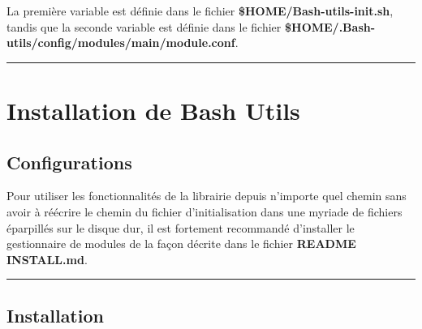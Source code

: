 \documentclass[a4paper,10pt]{article}
\begin{document}
    \begin{justify}
        La première variable est définie dans le fichier \textbf{\color{vars}\$HOME\color{path}/Bash-utils-init.sh}, tandis que la seconde variable est définie dans le fichier \textbf{\color{vars}\$HOME\color{path}/.Bash-utils/config/modules/main/module.conf}.
    \end{justify}





    \color{sec1}\par\noindent\rule{\textwidth}{0.4pt}\color{text}

    \color{sec1}
    \section{Installation de Bash Utils}\color{text}

    \color{sec2}
    \subsection{Configurations}\color{text}

    \begin{justify}
        Pour utiliser les fonctionnalités de la librairie depuis n'importe quel chemin sans avoir à réécrire le chemin du fichier d'initialisation dans une myriade de fichiers éparpillés sur le disque dur, il est fortement recommandé d'installer le gestionnaire de modules de la façon décrite dans le fichier \textbf{\color{path}README INSTALL.md}.
    \end{justify}




    \color{sec2}\par\noindent\rule{\textwidth}{0.4pt}\color{text}

    \color{sec2}
    \subsection{Installation}\color{text}
\end{document}
